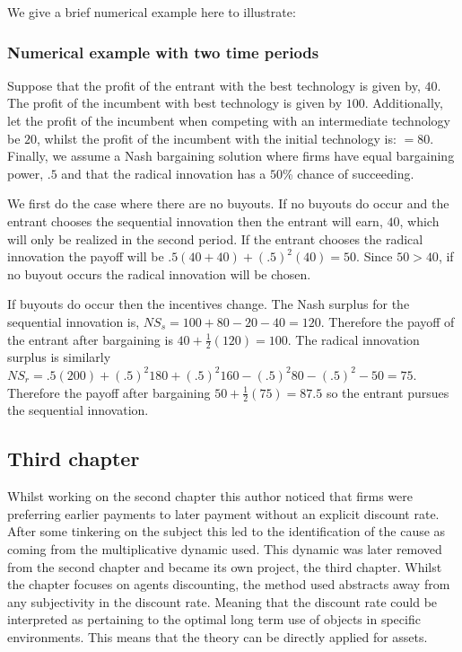 We give a brief numerical example here to illustrate: 
\subsubsection{Numerical example with two time periods}

Suppose that the profit of the entrant with the best technology is given by, $40$. The profit of the incumbent with best technology is given by $100$. Additionally, let the profit of the incumbent when competing with an intermediate technology be $20$, whilst the profit of the incumbent with the initial technology is: $=80$. Finally, we assume a Nash bargaining solution where firms have equal bargaining power, $.5$ and that the radical innovation has a $50$\% chance of succeeding. 

We first do the case where there are no buyouts. If no buyouts do occur and the entrant chooses the sequential innovation then the entrant will earn, $40$, which will only be realized in the second period. If the entrant chooses the radical innovation the payoff will be $.5(40+40)+(.5)^2(40)=50$. Since $50>40$, if no buyout occurs the radical innovation will be chosen. 

If buyouts do occur then the incentives change. The Nash surplus for the sequential innovation is, $NS_s = 100+80-20-40=120$. Therefore the payoff of the entrant after bargaining is $40+\frac{1}{2}(120)=100$. The radical innovation surplus is similarly $NS_r = .5(200)+(.5)^2 180+(.5)^2 160-(.5)^2 80-(.5)^2-50=75$. Therefore the payoff after bargaining $50+\frac{1}{2}(75)=87.5$ so the entrant pursues the sequential innovation. 

 \subsection{Third chapter}

Whilst working on the second chapter this author noticed that firms were preferring earlier payments to later payment without an explicit discount rate. After some tinkering on the subject this led to the identification of the cause as coming from the multiplicative dynamic used. This dynamic was later removed from the second chapter and became its own project, the third chapter. Whilst the chapter focuses on agents discounting, the method used abstracts away from any subjectivity in the discount rate. Meaning that the discount rate could be interpreted as pertaining to the optimal long term use of objects in specific environments. This means that the theory can be directly applied for assets.  

